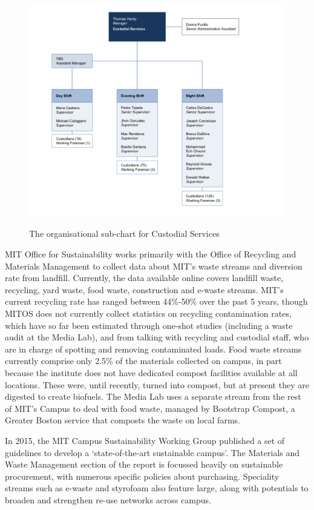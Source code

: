 \documentclass[nofonts,nols,justified,nobib]{tufte-book}
\begin{document}
\begin{figure}
 \includegraphics[width=1\linewidth]{img/2/custodial-overview.png}
  \label{orgs}
    \caption{The organisational sub-chart for Custodial Services}
\end{figure}


MIT Office for Sustainability works primarily with the Office of Recycling and Materials Management to collect data about MIT's waste streams and diversion rate from landfill. Currently, the data available online covers landfill waste, recycling, yard waste, food waste, construction and e-waste streams. MIT's current recycling rate has ranged between 44\%-50\% over the past 5 years, though MITOS does not currently collect statistics on recycling contamination rates, which have so far been estimated through one-shot studies (including a waste audit at the Media Lab), and from talking with recycling and custodial staff, who are in charge of spotting and removing contaminated loads. Food waste streams currently comprise only 2.5\% of the materials collected on campus, in part because the institute does not have dedicated compost facilities available at all locations. These were, until recently, turned into compost, but at present they are digested to create biofuels. The Media Lab uses a separate stream from the rest of MIT's Campus to deal with food waste, managed by Bootstrap Compost, a Greater Boston service that composts the waste on local farms.

In 2015, the MIT Campus Sustainability Working Group published a set of guidelines to develop a `state-of-the-art sustainable campus'. The Materials and Waste Management section of the report is focussed heavily on sustainable procurement, with numerous specific policies about purchasing. Speciality streams such as e-waste and styrofoam also feature large, along with potentials to broaden and strengthen re-use networks across campus.
\end{document}
